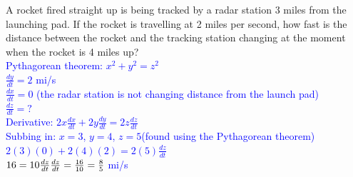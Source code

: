 \documentclass{ximera}
\begin{document}
\begin{exercise}
    A rocket fired straight up is being tracked by a radar station 3 miles from the launching pad.  If the rocket is travelling at 2 miles per second, how fast is the distance between the rocket and the tracking station changing at the moment when the rocket is 4 miles up?\\
    \textcolor{blue}{Pythagorean theorem: $x^2+y^2=z^2$\\
    $\frac{dy}{dt}=2$ mi/s\\
    $\frac{dx}{dt}=0$ (the radar station is not changing distance from the launch pad)\\
    $\frac{dz}{dt}=?$\\
    Derivative: $2x\frac{dx}{dt}+2y\frac{dy}{dt}=2z\frac{dz}{dt}$\\
    Subbing in: $x=3$, $y=4$, $z=5$(found using the Pythagorean theorem)\\
    $2(3)(0)+2(4)(2)=2(5)\frac{dz}{dt}$\\
    $16=10\frac{dz}{dt}\\
    \frac{dz}{dt}=\frac{16}{10}=\frac{8}{5}$ mi/s}
\end{exercise}
    
 
\end{document}
